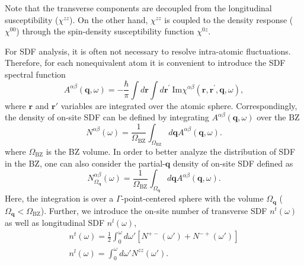 Note that the transverse components are decoupled from the longitudinal susceptibility ($\chi^{zz}$). On the other hand, $\chi^{zz}$ is coupled to the density response ($\chi^{00}$) through the spin-density susceptibility function $\chi^{0z}$. 

For SDF analysis, it is often not necessary to resolve intra-atomic fluctuations. Therefore, for each nonequivalent atom it is convenient to introduce the SDF spectral function 
\begin{equation}
A^{\alpha\beta}(\mathbf{q},\omega)= -\frac{\hbar}{\pi}\int d\mathbf{r}\int d\mathbf{r}^\prime\ \text{Im}\chi^{\alpha\beta}(\mathbf{r},\mathbf{r} ^{\prime},\mathbf{q},\omega),
\label{ASDF}
\end{equation} 
where $\mathbf{r}$ and $\mathbf{r}'$ variables are integrated over the atomic sphere. Correspondingly, the density of on-site SDF can be defined by integrating $A^{\alpha\beta}(\mathbf{q},\omega)$ over the BZ
\begin{equation}
N^{\alpha\beta}(\omega)=\frac{1}{\Omega_{\text{BZ}}}\int_{\Omega_{\text{BZ}}}d\mathbf{q} A^{\alpha\beta}(\mathbf{q},\omega). 
\label{NSDF}
\end{equation} 
where $\Omega_{\text{BZ}}$ is the BZ volume. In order to better analyze the distribution of SDF in the BZ, one can also consider the partial-$\mathbf{q}$ density of on-site SDF defined as
\begin{equation}
N_{\Omega_{\mathbf{q}}}^{\alpha\beta}(\omega)=\frac{1}{\Omega_{\text{BZ}}}\int_{\Omega_{\mathbf{q}}}d\mathbf{q} A^{\alpha\beta}(\mathbf{q},\omega). 
\label{NrSDF}
\end{equation} 
Here, the integration is over a $\Gamma$-point-centered sphere with the volume $\Omega_{\mathbf{q}}$ ($\Omega_{\mathbf{q}}<\Omega_{\text{BZ}}$). Further, we introduce the on-site number of transverse SDF $n^t(\omega)$ as well as longitudinal SDF $n^l(\omega)$,
\begin{eqnarray}
n^t(\omega) =\frac{1}{2}\int_{0}^{\omega }d\omega'\left[N^{+-}(\omega')+N^{-+}(\omega')\right] \\
\label{ntSDF}
n^l(\omega) =\int_{0}^{\omega }d\omega' N^{zz}(\omega').
\label{nlSDF}
\end{eqnarray}

